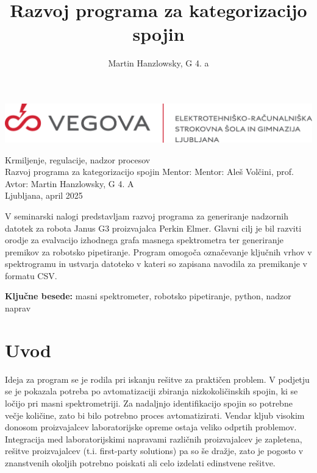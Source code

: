 \documentclass[a4paper,12pt]{article}
\title{\LARGE{\textbf{Razvoj programa za kategorizacijo spojin}}}
\author{Martin Hanzlowsky, G 4. a}
\date{}
\begin{document}
\begin{titlepage}
\includegraphics[scale=1]{assets/logotip_vegova_leze_brezokvirja.png}\\
\begin{center}
\vfill \Huge{ Krmiljenje, regulacije, nadzor procesov} \\\large{Razvoj programa za kategorizacijo spojin}
\normalsize
\vfill Mentor: Mentor: Aleš Volčini, prof. \hfill Avtor: Martin Hanzlowsky, G 4. A\\
\null Ljubljana, april 2025
\end{center}
\thispagestyle{empty}
\end{titlepage}

\setcounter{page}{1}

\begin{tcolorbox}[title=Povzetek, colback=white, colframe=black, colbacktitle=white, coltitle=black]
V seminarski nalogi predstavljam razvoj programa za generiranje nadzornih datotek za robota Janus G3 proizvajalca Perkin Elmer. Glavni cilj je bil razviti orodje za evalvacijo izhodnega grafa masnega spektrometra ter generiranje premikov za robotsko pipetiranje. Program omogoča označevanje ključnih vrhov v spektrogramu in ustvarja datoteko v kateri so zapisana navodila za premikanje v formatu CSV.

\vspace{0.3cm}
\noindent\textbf{Ključne besede:} masni spektrometer, robotsko pipetiranje, python, nadzor naprav
\end{tcolorbox}
\thispagestyle{empty}
\newpage
\tableofcontents
\thispagestyle{empty}
\listoffigures
\cleardoublepage


\section{Uvod}
Ideja za program se je rodila pri iskanju rešitve za praktičen problem. V podjetju se je pokazala potreba po avtomatizaciji zbiranja nizkokoličinskih spojin, ki se ločijo pri masni spektrometriji. Za nadaljnjo identifikacijo spojin so potrebne večje količine, zato bi bilo potrebno proces avtomatizirati. Vendar kljub visokim donosom proizvajalcev laboratorijske opreme ostaja veliko odprtih problemov. Integracija med laboratorijskimi napravami različnih proizvajalcev je zapletena, rešitve proizvajalcev (t.i. first-party solutions) pa so še dražje, zato je pogosto v znanstvenih okoljih potrebno poiskati ali celo izdelati edinstvene rešitve.
\end{document}
